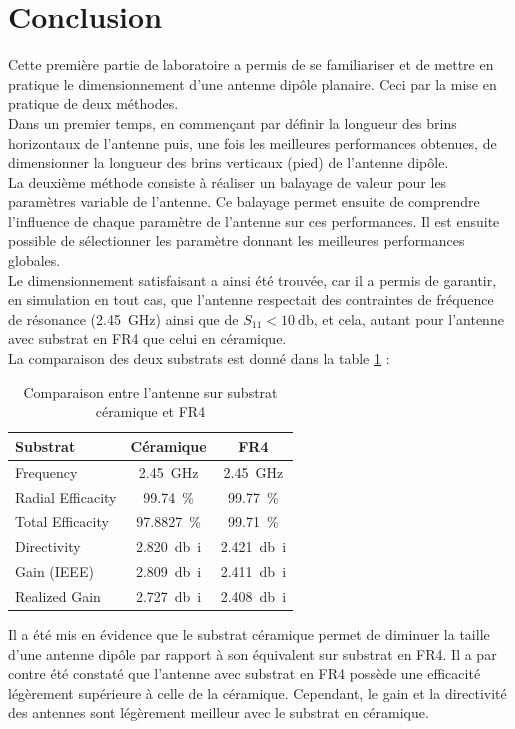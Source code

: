\documentclass[Deriaz_Traiber_Labo02]{subfiles}
\begin{document}
\pagebreak

\section{Conclusion}

Cette première partie de laboratoire a permis de se familiariser et de mettre en pratique le dimensionnement d'une antenne dipôle planaire. Ceci par la mise en pratique de deux méthodes.\\

Dans un premier temps, en commençant par définir la longueur des brins horizontaux de l'antenne puis, une fois les meilleures performances obtenues, de dimensionner la longueur des brins verticaux (pied) de l'antenne dipôle.\\

La deuxième méthode consiste à réaliser un balayage de valeur pour les paramètres variable de l'antenne. Ce balayage permet ensuite de comprendre l'influence de chaque paramètre de l'antenne sur ces performances. Il est ensuite possible de sélectionner les paramètre donnant les meilleures performances globales.\\

Le dimensionnement satisfaisant a ainsi été trouvée, car il a permis de garantir, en simulation en tout cas, que l'antenne respectait des contraintes de fréquence de résonance (\SI{2.45}{\giga\hertz}) ainsi que de $S_{11}<\SI{10}{\decibel}$, et cela, autant pour l'antenne avec substrat en FR4 que celui en céramique.\\

La comparaison des deux substrats est donné dans la table \ref{tab:comp-substrat} :
\begin{table}[H]
\centering
\begin{tabular}{l c c}\hline
Substrat				& Céramique					&	FR4		\\\hline
Frequency			& \SI{2.45}{\giga\hertz}		&	\SI{2.45}{\giga\hertz}\\
Radial Efficacity	& \SI{99.74}{\percent} 		&	\SI{99.77}{\percent}	\\
Total Efficacity		& \SI{97.8827}{\percent}		& 	\SI{99.71}{\percent}	\\
Directivity			& \SI{2.820}{\decibel i}		&	\SI{2.421}{\decibel i}\\
Gain	 (IEEE)			& \SI{2.809}{\decibel i}		&	\SI{2.411}{\decibel i}\\
Realized Gain		& \SI{2.727}{\decibel i}		&	\SI{2.408}{\decibel i}\\\hline
\end{tabular}
\caption{Comparaison entre l'antenne sur substrat céramique et FR4}
\label{tab:comp-substrat}
\end{table}

Il a été mis en évidence que le substrat céramique permet de diminuer la taille d'une antenne dipôle par rapport à son équivalent sur substrat en FR4. Il a par contre été constaté que l'antenne avec substrat en FR4 possède une efficacité légèrement supérieure à celle de la céramique. Cependant, le gain et la directivité des antennes sont légèrement meilleur avec le substrat en céramique.
\end{document}
